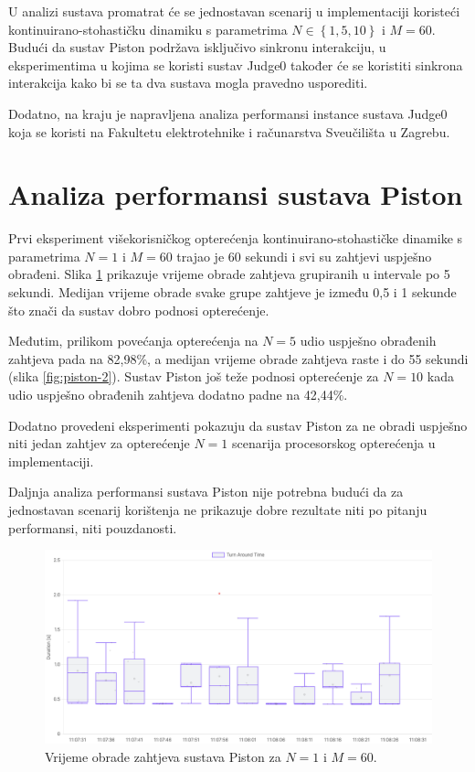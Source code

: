 \documentclass[times, utf8, diplomski]{fer}
\begin{document}
U analizi sustava promatrat će se jednostavan scenarij u  implementaciji koristeći kontinuirano-stohastičku dinamiku s parametrima $N \in \left\{1,5,10\right\}$ i $M=60$. Budući da sustav Piston podržava isključivo sinkronu interakciju, u eksperimentima u kojima se koristi sustav Judge0 također će se koristiti sinkrona interakcija kako bi se ta dva sustava mogla pravedno usporediti.

Dodatno, na kraju je napravljena analiza performansi instance sustava Judge0 koja se koristi na Fakultetu elektrotehnike i računarstva Sveučilišta u Zagrebu.

\section{Analiza performansi sustava Piston}
Prvi eksperiment višekorisničkog opterećenja kontinuirano-stohastičke dinamike s parametrima $N=1$ i $M=60$ trajao je 60 sekundi i svi su zahtjevi uspješno obrađeni. Slika \ref{fig:piston-1} prikazuje vrijeme obrade zahtjeva grupiranih u intervale po 5 sekundi. Medijan vrijeme obrade svake grupe zahtjeve je između 0,5 i 1 sekunde što znači da sustav dobro podnosi opterećenje. 

Međutim, prilikom povećanja opterećenja na $N=5$ udio uspješno obrađenih zahtjeva pada na 82,98\%, a medijan vrijeme obrade zahtjeva raste i do 55 sekundi (slika \ref{fig:piston-2}). Sustav Piston još teže podnosi opterećenje za $N=10$ kada udio uspješno obrađenih zahtjeva dodatno padne na 42,44\%.

Dodatno provedeni eksperimenti pokazuju da sustav Piston za ne obradi uspješno niti jedan zahtjev za opterećenje $N=1$ scenarija procesorskog opterećenja u  implementaciji.

Daljnja analiza performansi sustava Piston nije potrebna budući da za jednostavan scenarij korištenja ne prikazuje dobre rezultate niti po pitanju performansi, niti pouzdanosti.

\begin{figure}[htb]
	\centering
	\includegraphics[width=\textwidth]{images/Piston TAT for 1 5s.png}
	\caption{
		Vrijeme obrade zahtjeva sustava Piston za $N=1$ i $M=60$.
	}
	\label{fig:piston-1}
\end{figure}
\end{document}
